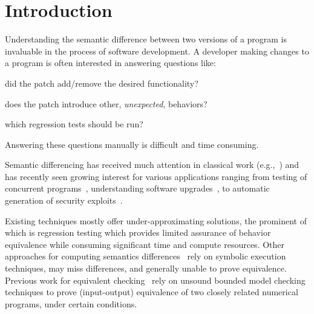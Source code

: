 \section{Introduction} 



Understanding the semantic difference between two versions of a program is invaluable in the process of software development. A developer making changes to a program is often interested in answering questions like:
\begin{inparaenum}[(i)]
\item did the patch add/remove the desired functionality?
\item does the patch introduce other, \emph{unexpected}, behaviors?
\item which regression tests should be run?
\end{inparaenum}
Answering these questions manually is difficult and time consuming.

Semantic differencing has received much attention in classical work (e.g.,~\cite{Horwitz90,Horwitz89,Hoare69}) and has recently seen growing interest for various applications ranging from testing of concurrent programs~\cite{ChakiGurfinkelStrichman12}, understanding software upgrades~\cite{JinOrsoXie10}, to automatic generation of security exploits~\cite{BrumleyPoosankamSongZheng08}.

Existing techniques mostly offer under-approximating solutions, the prominent of which is regression testing which provides limited assurance of behavior equivalence while consuming significant time and compute resources. 
Other approaches for computing semantics differences~\cite{DwyerElbaumPerson08,EnglerRamos11} rely on symbolic execution techniques, may miss differences, and generally unable to prove equivalence. Previous work for equivalent checking~\cite{GodlinStrichman09} rely on unsound bounded model checking techniques to prove (input-output) equivalence of two closely related numerical programs, under certain conditions.

